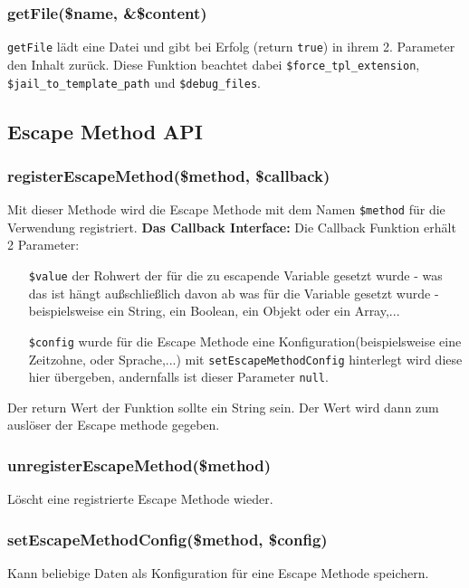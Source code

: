 \documentclass[a4paper,10pt]{article}
\begin{document}
\subsubsection{getFile(\$name, \&\$content)}
{\tt getFile} l\"adt eine Datei und gibt bei Erfolg (return {\tt true}) in ihrem 2. Parameter den Inhalt zur\"uck. Diese Funktion beachtet
dabei {\tt \$force\_tpl\_extension}, {\tt \$jail\_to\_template\_path} und {\tt \$debug\_files}.

\subsection{Escape Method API}

\subsubsection{registerEscapeMethod(\$method, \$callback)}
Mit dieser Methode wird die Escape Methode mit dem Namen {\tt \$method} f\"ur die Verwendung registriert.\newline
\newline
{\bf Das Callback Interface:}\newline
Die Callback Funktion erh\"alt 2 Parameter:
\begin{itemize}
  \item[{\tt \$value}] der Rohwert der f\"ur die zu escapende Variable gesetzt wurde - was das ist h\"angt au\ss{}schlie\ss{}lich davon ab was f\"ur die Variable gesetzt wurde - beispielsweise ein String, ein Boolean, ein Objekt oder ein Array,...
  \item[{\tt \$config}] wurde f\"ur die Escape Methode eine Konfiguration(beispielsweise eine Zeitzohne, oder Sprache,...) mit {\tt setEscapeMethodConfig} hinterlegt wird diese hier \"ubergeben, andernfalls ist dieser Parameter {\tt null}.
\end{itemize}
Der return Wert der Funktion sollte ein String sein. Der Wert wird dann zum ausl\"oser der Escape methode gegeben.

\subsubsection{unregisterEscapeMethod(\$method)}
L\"oscht eine registrierte Escape Methode wieder.

\subsubsection{setEscapeMethodConfig(\$method, \$config)}
Kann beliebige Daten als Konfiguration f\"ur eine Escape Methode speichern.
\end{document}
